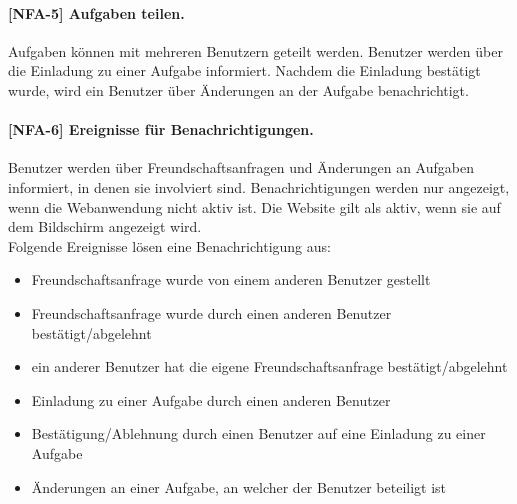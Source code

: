 \paragraph{[NFA-5] Aufgaben teilen.} Aufgaben können mit mehreren Benutzern geteilt werden. Benutzer werden über die Einladung zu einer Aufgabe informiert. Nachdem die Einladung bestätigt wurde, wird ein Benutzer über Änderungen an der Aufgabe benachrichtigt.

\paragraph{[NFA-6] Ereignisse für Benachrichtigungen.} Benutzer werden über Freundschaftsanfragen und Änderungen an Aufgaben informiert, in denen sie involviert sind. Benachrichtigungen werden nur angezeigt, wenn die Webanwendung nicht aktiv ist. Die Website gilt als \glqq aktiv\grqq, wenn sie auf dem Bildschirm angezeigt wird. \\
Folgende Ereignisse lösen eine Benachrichtigung aus:

\begin{itemize}
\setlength{\itemsep}{0pt}%
\setlength{\parskip}{0pt}%
\item Freundschaftsanfrage wurde von einem anderen Benutzer gestellt
\item Freundschaftsanfrage wurde durch einen anderen Benutzer bestätigt/abgelehnt
\item ein anderer Benutzer hat die eigene Freundschaftsanfrage bestätigt/abgelehnt
\item Einladung zu einer Aufgabe durch einen anderen Benutzer
\item Bestätigung/Ablehnung durch einen Benutzer auf eine Einladung zu einer Aufgabe
\item Änderungen an einer Aufgabe, an welcher der Benutzer beteiligt ist
\end{itemize}
